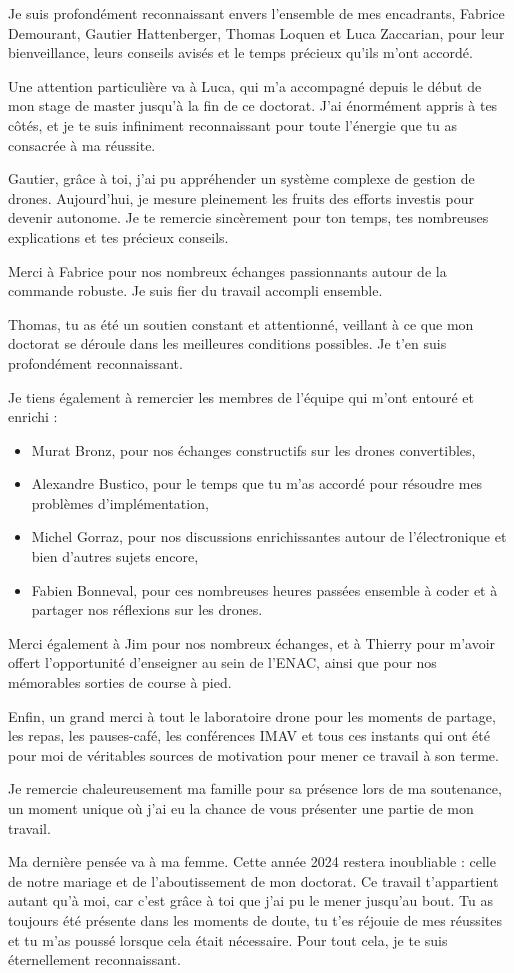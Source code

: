 Je suis profondément reconnaissant envers l’ensemble de mes encadrants, Fabrice Demourant, Gautier Hattenberger, Thomas Loquen et Luca Zaccarian, pour leur bienveillance, leurs conseils avisés et le temps précieux qu’ils m’ont accordé.

Une attention particulière va à Luca, qui m’a accompagné depuis le début de mon stage de master jusqu’à la fin de ce doctorat. J’ai énormément appris à tes côtés, et je te suis infiniment reconnaissant pour toute l’énergie que tu as consacrée à ma réussite.

Gautier, grâce à toi, j’ai pu appréhender un système complexe de gestion de drones. Aujourd’hui, je mesure pleinement les fruits des efforts investis pour devenir autonome. Je te remercie sincèrement pour ton temps, tes nombreuses explications et tes précieux conseils.

Merci à Fabrice pour nos nombreux échanges passionnants autour de la commande robuste. Je suis fier du travail accompli ensemble.

Thomas, tu as été un soutien constant et attentionné, veillant à ce que mon doctorat se déroule dans les meilleures conditions possibles. Je t’en suis profondément reconnaissant.

Je tiens également à remercier les membres de l’équipe qui m’ont entouré et enrichi :
\begin{itemize}
    \item Murat Bronz, pour nos échanges constructifs sur les drones convertibles,
    \item Alexandre Bustico, pour le temps que tu m’as accordé pour résoudre mes problèmes d’implémentation,
    \item Michel Gorraz, pour nos discussions enrichissantes autour de l’électronique et bien d’autres sujets encore,
    \item Fabien Bonneval, pour ces nombreuses heures passées ensemble à coder et à partager nos réflexions sur les drones.
\end{itemize}


Merci également à Jim pour nos nombreux échanges, et à Thierry pour m’avoir offert l’opportunité d’enseigner au sein de l’ENAC, ainsi que pour nos mémorables sorties de course à pied.

Enfin, un grand merci à tout le laboratoire drone pour les moments de partage, les repas, les pauses-café, les conférences IMAV et tous ces instants qui ont été pour moi de véritables sources de motivation pour mener ce travail à son terme.

Je remercie chaleureusement ma famille pour sa présence lors de ma soutenance, un moment unique où j’ai eu la chance de vous présenter une partie de mon travail.

Ma dernière pensée va à ma femme. Cette année 2024 restera inoubliable : celle de notre mariage et de l’aboutissement de mon doctorat. Ce travail t’appartient autant qu’à moi, car c’est grâce à toi que j’ai pu le mener jusqu’au bout. Tu as toujours été présente dans les moments de doute, tu t’es réjouie de mes réussites et tu m’as poussé lorsque cela était nécessaire. Pour tout cela, je te suis éternellement reconnaissant.
